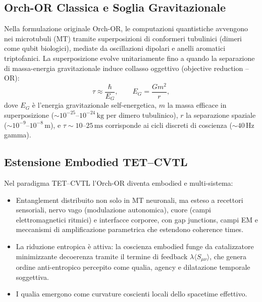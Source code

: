 \documentclass[12pt,a4paper]{article}
\begin{document}
\subsection{Orch-OR Classica e Soglia Gravitazionale}

Nella formulazione originale Orch-OR, le computazioni quantistiche avvengono nei microtubuli (MT) tramite superposizioni di conformeri tubulinici (dimeri come qubit biologici), mediate da oscillazioni dipolari e anelli aromatici triptofanici. La superposizione evolve unitariamente fino a quando la separazione di massa-energia gravitazionale induce collasso oggettivo (objective reduction -- OR):
\begin{equation}
\tau \approx \frac{\hbar}{E_G}, \qquad E_G = \frac{G m^2}{r},
\label{eq:OrchOR_time}
\end{equation}
dove $E_G$ è l'energia gravitazionale self-energetica, $m$ la massa efficace in superposizione ($\sim 10^{-25}$--$10^{-24}\,\mathrm{kg}$ per dimero tubulinico), $r$ la separazione spaziale ($\sim 10^{-9}$--$10^{-8}\,\mathrm{m}$), e $\tau \sim 10$--$25\,\mathrm{ms}$ corrisponde ai cicli discreti di coscienza ($\sim 40\,\mathrm{Hz}$ gamma).

\subsection{Estensione Embodied TET--CVTL}

Nel paradigma TET--CVTL l'Orch-OR diventa embodied e multi-sistema:
\begin{itemize}
    \item Entanglement distribuito non solo in MT neuronali, ma esteso a recettori sensoriali, nervo vago (modulazione autonomica), cuore (campi elettromagnetici ritmici) e interfacce corporee, con gap junctions, campi EM e meccanismi di amplificazione parametrica che estendono coherence times.
    \item La riduzione entropica è attiva: la coscienza embodied funge da catalizzatore minimizzante decoerenza tramite il termine di feedback $\lambda \langle S_{\mu\nu} \rangle$, che genera ordine anti-entropico percepito come qualia, agency e dilatazione temporale soggettiva.
    \item I qualia emergono come curvature coscienti locali dello spacetime effettivo.
\end{itemize}
\end{document}
